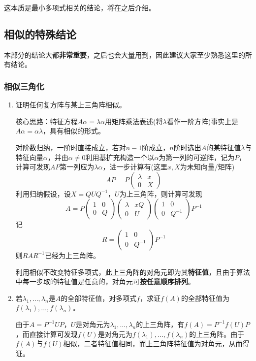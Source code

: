 \documentclass[a4paper,UTF8,fontset=windows]{ctexart}
\newcommand*{\note}{\noindent *}
\begin{document}
\note 这本质是最小多项式相关的结论，将在之后介绍。

\subsection{相似的特殊结论}
\note 本部分的结论大都\textbf{非常重要}，之后也会大量用到，因此建议大家至少熟悉这里的所有结论。

\subsubsection{相似三角化}
\begin{enumerate}
    \item 证明任何复方阵与某上三角阵相似。
    
    核心思路：特征方程$A\alpha=\lambda\alpha$用矩阵乘法表述(将$\lambda$看作一阶方阵)事实上是$A\alpha=\alpha\lambda$，具有相似的形式。

    对阶数归纳，一阶时直接成立，若对$n-1$阶成立，$n$阶时选出$A$的某特征值$\lambda$与特征向量$\alpha$，并由$\alpha\ne0$利用基扩充构造一个以$\alpha$为第一列的可逆阵，记为$P$，计算可发现$AP$第一列应为$\lambda\alpha$，进一步计算有(这里$x,X$为未知向量/矩阵)
    $$AP=P\begin{pmatrix}\lambda&x\\0&X\end{pmatrix}$$
    利用归纳假设，设$X=QUQ^{-1}$，$U$为上三角阵，则计算可发现
    $$A=P\begin{pmatrix}1&0\\0&Q\end{pmatrix}\begin{pmatrix}\lambda&xQ\\0&U\end{pmatrix}\begin{pmatrix}1&0\\0&Q^{-1}\end{pmatrix}P^{-1}$$
    记
    $$R=\begin{pmatrix}1&0\\0&Q^{-1}\end{pmatrix}P^{-1}$$
    则$RAR^{-1}$已经为上三角阵。

    \note 利用相似不改变特征多项式，此上三角阵的对角元即为其\textbf{特征值}，且由于算法中每一步取的特征值是任意的，对角元可\textbf{按任意顺序排列}。

    \item 若$\lambda_1,\dots,\lambda_n$是$A$的全部特征值，对多项式$f$，求证$f(A)$的全部特征值为$f(\lambda_1),\dots,f(\lambda_n)$。
    
    由于$A=P^{-1}UP$，$U$是对角元为$\lambda_1,\dots,\lambda_n$的上三角阵，有$f(A)=P^{-1}f(U)P$，而直接计算可发现$f(U)$是对角元为$f(\lambda_1),\dots,f(\lambda_n)$的上三角阵。由于$f(A)$与$f(U)$相似，二者特征值相同，而上三角阵特征值为对角元，从而得证。
\end{enumerate}
\end{document}
